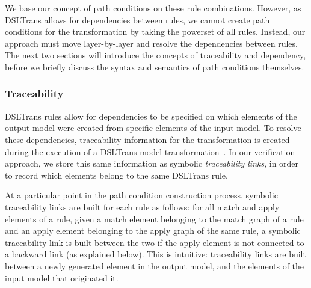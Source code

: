 We base our concept of path conditions on these rule combinations. However, as
DSLTrans allows for dependencies between rules, we cannot create path conditions
for the transformation by taking the powerset of all rules. Instead, our
approach must move layer-by-layer and resolve the dependencies between rules.
The next two sections will introduce the concepts of traceability and dependency, before we
briefly discuss the syntax and semantics of path conditions themselves.

\subsubsection{Traceability}
\label{subsubsec:traceability}

DSLTrans rules allow for dependencies to be specified on which elements of the
output model were created from specific elements of the input model. To resolve
these dependencies, traceability information for the transformation is created
during the execution of a DSLTrans model transformation~\cite{DBLP:conf/sle/BarrocaLAFS10}.
In our verification approach, we store this same information as symbolic \emph{traceability links}, in
order to record which elements belong to the same DSLTrans rule.


At a particular point in the path condition construction process, symbolic traceability links are built for
each rule as follows: for all match and apply elements of a rule, given a match
element belonging to the match graph of a rule and an apply element belonging to
the apply graph of the same rule, a symbolic traceability link is built between the two
if the apply element is not connected to a backward link (as explained below).
This is intuitive: traceability links are built between a newly generated
element in the output model, and the elements of the input model that originated
it.

